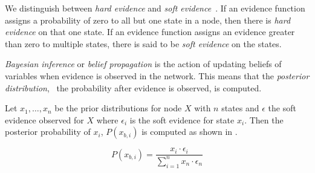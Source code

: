 We distinguish between \emph{hard evidence} and \emph{soft evidence}~\cite{kjaerulff2008bayesian}. If an evidence function assigns a probability of zero to all but one state in a node, then there is \emph{hard evidence} on that one state. If an evidence function assigns an evidence greater than zero to multiple states, there is said to be \emph{soft evidence} on the states.

\emph{Bayesian inference} or \emph{belief propagation} is the action of updating beliefs of variables when evidence is observed in the network. This means that the \emph{posterior distribution}, \ie~the probability after evidence is observed, is computed.

Let $x_1,\ldots,x_n$ be the prior distributions for node $X$ with $n$ states and $\epsilon$ the soft evidence observed for $X$ where $\epsilon_i$ is the soft evidence for state $x_i$. Then the posterior probability of $x_i$, $P(x_{b,i})$ is computed as shown in .

\begin{equation}
\label{eq:analysis:bayesian-network:soft-evidence}
P(x_{b,i}) = \frac{x_i \cdot \epsilon_i}{\sum\limits_{i=1}^n x_n \cdot \epsilon_n}
\end{equation}









